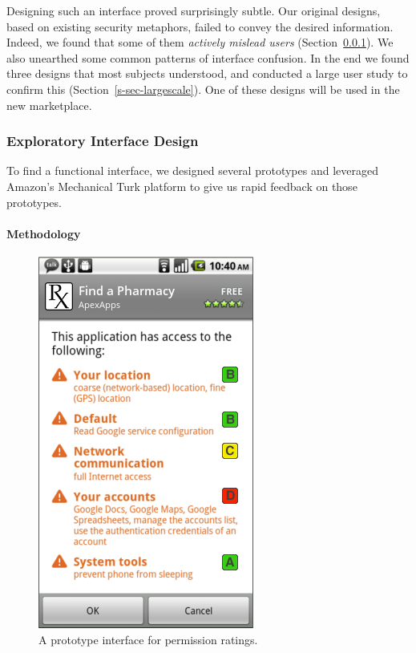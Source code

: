 \documentclass[11pt]{article}
\newcommand{\refsec}[1]{Section~\ref{#1}}
\begin{document}
Designing such an interface proved surprisingly subtle. 
Our original designs, based on existing security 
metaphors, failed to convey the desired information.
Indeed, we found that some of them \emph{actively 
mislead users} (\refsec{sec-ui-design}).
We also unearthed some common patterns of interface
confusion. In the end we found three designs that most 
subjects understood, and
conducted a large user study to confirm this
(\refsec{s-sec-largescale}). One of these designs will be used in the new
marketplace.

\subsubsection{Exploratory Interface Design}
\label{sec-ui-design}

To find a functional interface, we designed several prototypes and 
leveraged Amazon's Mechanical Turk platform to give us rapid feedback 
on those prototypes.

\paragraph{Methodology}
\label{subsec-small-methods}

\begin{figure}
    \begin{center}
        \includegraphics[width=.8\linewidth]{img/GradesPerms.png}
    \end{center}
    \caption{A prototype interface for permission ratings.}
    \label{grade-perms}
\end{figure}
\end{document}
